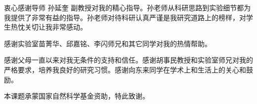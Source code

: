 \begin{acknowledgement}
  衷心感谢导师 孙延奎 副教授对我的精心指导。孙老师从科研思路到实验细节都为我提供了非常有益的指导。孙老师对待科研认真严谨是我研究道路上的榜样，对学生热忱关切让我非常感动。

  感谢实验室苗菁华、邱嘉铭、李闪师兄和其它同学对我的热情帮助。

  感谢父母一直以来对我无条件的支持和信任。感谢胡事民教授和实验室师兄对我的严格要求，培养我良好的研究习惯。感谢向东来同学在学术上和生活上的关心和鼓励。

  本课题承蒙国家自然科学基金资助，特此致谢。

  
  \end{acknowledgement}
